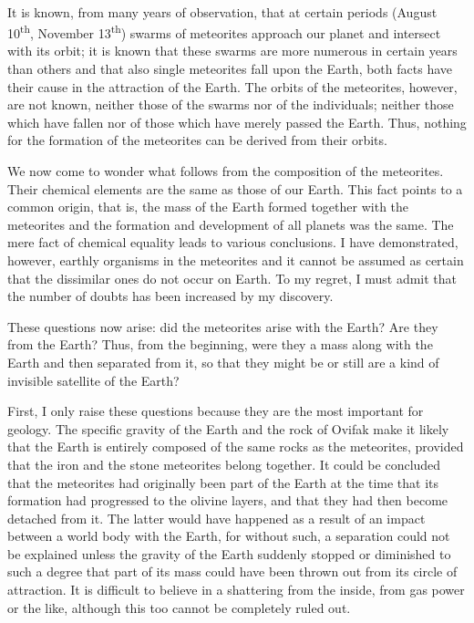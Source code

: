 \documentclass[a4paper, 12pt, oneside]{article}
\begin{document}
\paragraph*{}
It is known, from many years of observation, that at certain periods (August 10\textsuperscript{th}, November 13\textsuperscript{th}) swarms of meteorites approach our planet and intersect with its orbit; it is known that these swarms are more numerous in certain years than others and that also single meteorites fall upon the Earth, both facts have their cause in the attraction of the Earth. The orbits of the meteorites, however, are not known, neither those of the swarms nor of the individuals; neither those which have fallen nor of those which have merely passed the Earth. Thus, nothing for the formation of the meteorites can be derived from their orbits.

We now come to wonder what follows from the composition of the meteorites. Their chemical elements are the same as those of our Earth. This fact points to a common origin, that is, the mass of the Earth formed together with the meteorites and the formation and development of all planets was the same. The mere fact of chemical equality leads to various conclusions. I have demonstrated, however, earthly organisms in the meteorites and it cannot be assumed as certain that the dissimilar ones do not occur on Earth. To my regret, I must admit that the number of doubts has been increased by my discovery.

These questions now arise: did the meteorites arise with the Earth? Are they from the Earth? Thus, from the beginning, were they a mass along with the Earth and then separated from it, so that they might be or still are a kind of invisible satellite of the Earth?

First, I only raise these questions because they are the most important for geology. The specific gravity of the Earth and the rock of Ovifak make it likely that the Earth is entirely composed of the same rocks as the meteorites, provided that the iron and the stone meteorites belong together. It could be concluded that the meteorites had originally been part of the Earth at the time that its formation had progressed to the olivine layers, and that they had then become detached from it. The latter would have happened as a result of an impact between a world body with the Earth, for without such, a separation could not be explained unless the gravity of the Earth suddenly stopped or diminished to such a degree that part of its mass could have been thrown out from its circle of attraction. It is difficult to believe in a shattering from the inside, from gas power or the like, although this too cannot be completely ruled out.
\end{document}
